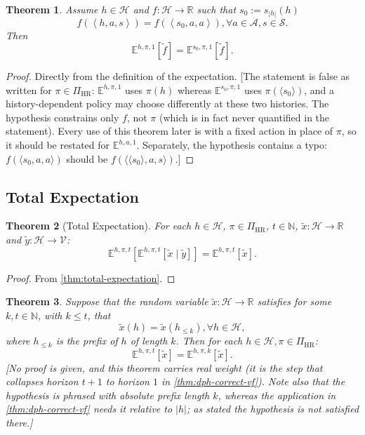\documentclass[letterpaper]{article}
\theoremstyle{plain}
\newtheorem{theorem}{Theorem}[subsection]
\theoremstyle{definition}
\theoremstyle{remark}
\newcommand{\Nats}{\mathbb{N}}
\newcommand{\Real}{\mathbb{R}}
\newcommand{\E}{\mathbb{E}}
\newcommand{\PiHR}{\Pi_{\mathrm{HR}}}
\newcommand{\cc}[1]{\textcolor{ccolor}{[#1]}}
\newcommand{\lean}[1]{\textcolor{blue}{(\emph{LEAN}: \texttt{#1})}}
\begin{document}
\begin{theorem} \label{thm:exph-horizon-trim}
Assume $h \in \mathcal{H}$ and $f \colon \mathcal{H} \to \Real$ such that $s_0 := s_{|h|}(h)$
\[
f(\left< h, a, s \right>) = f(\left< s_0, a, a \right>) , \forall a\in \mathcal{A}, s\in \mathcal{S}.
\]
Then
\[
\E^{h,\pi,1}\left[ \tilde{f} \right] =   
\E^{s_0,\pi,1}\left[ \tilde{f} \right].
\]
\end{theorem}
\begin{proof}
  Directly from the definition of the expectation.
\cc{The statement is false as written for $\pi\in \PiHR$: $\E^{h,\pi,1}$ uses $\pi(h)$ whereas $\E^{s_0,\pi,1}$ uses $\pi(\langle s_0\rangle)$, and a history-dependent policy may choose differently at these two histories. The hypothesis constrains only $f$, not $\pi$ (which is in fact never quantified in the statement). Every use of this theorem later is with a fixed action in place of $\pi$, so it should be restated for $\E^{h,a,1}$. Separately, the hypothesis contains a typo: $f(\langle s_0,a,a\rangle)$ should be $f(\langle \langle s_0\rangle, a, s\rangle)$.}
\end{proof}

\subsection{Total Expectation}

\begin{theorem}[Total Expectation] \label{thm:total-expectation-h}
  For each $h\in \mathcal{H}$, $\pi\in \PiHR$, $t\in \Nats$, $\tilde{x}\colon \mathcal{H} \to \Real$ and $\tilde{y}\colon \mathcal{H} \to \mathcal{V}$:
  \[
    \E^{h, \pi, t} \left[ \E^{h, \pi, t} \left[  \tilde{x} \mid  \tilde{y} \right] \right]
    =
    \E^{h, \pi, t} \left[ \tilde{x} \right].
  \]
\end{theorem}
\begin{proof}
From \cref{thm:total-expectation}.
\end{proof}

\begin{theorem}\label{thm:exp-horizon-cut}
Suppose that the random variable $\tilde{x}\colon \mathcal{H} \to \Real$ satisfies for some $k, t \in \Nats$, with $k \le t$, that
  \[
   \tilde{x}(h) = \tilde{x}(h_{\le k}) , \forall h\in  \mathcal{H},
 \]
 where $h_{\le k}$ is the prefix of $h$ of length $k$. Then for each $h\in \mathcal{H}, \pi\in \PiHR$:
 \[
  \E^{h,\pi,t} \left[ \tilde{x} \right]  = \E^{h,\pi,k} \left[  \tilde{x} \right].
 \]
 \cc{No proof is given, and this theorem carries real weight (it is the step that collapses horizon $t+1$ to horizon $1$ in \cref{thm:dph-correct-vf}). Note also that the hypothesis is phrased with \emph{absolute} prefix length $k$, whereas the application in \cref{thm:dph-correct-vf} needs it relative to $|h|$; as stated the hypothesis is not satisfied there.}
\end{theorem}
\end{document}
